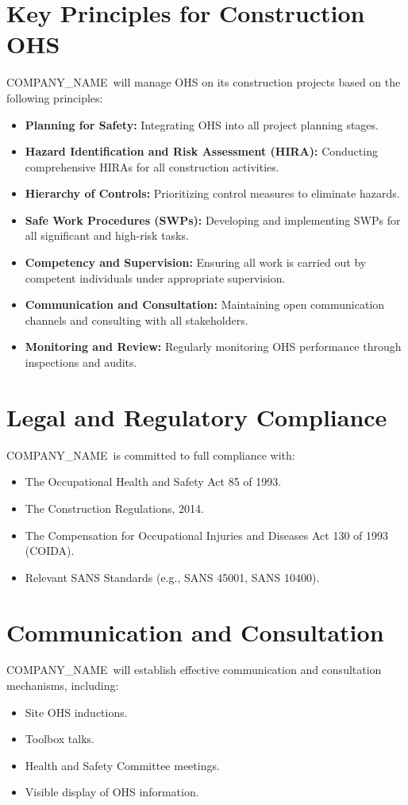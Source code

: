\documentclass[11pt]{article}
\newcommand{\clientName}{{{COMPANY_NAME}}}
\begin{document}
\section{Key Principles for Construction OHS}
\clientName\ will manage OHS on its construction projects based on the following principles:
\begin{itemize}
    \item \textbf{Planning for Safety:} Integrating OHS into all project planning stages.
    \item \textbf{Hazard Identification and Risk Assessment (HIRA):} Conducting comprehensive HIRAs for all construction activities.
    \item \textbf{Hierarchy of Controls:} Prioritizing control measures to eliminate hazards.
    \item \textbf{Safe Work Procedures (SWPs):} Developing and implementing SWPs for all significant and high-risk tasks.
    \item \textbf{Competency and Supervision:} Ensuring all work is carried out by competent individuals under appropriate supervision.
    \item \textbf{Communication and Consultation:} Maintaining open communication channels and consulting with all stakeholders.
    \item \textbf{Monitoring and Review:} Regularly monitoring OHS performance through inspections and audits.
\end{itemize}

\section{Legal and Regulatory Compliance}
\clientName\ is committed to full compliance with:
\begin{itemize}
    \item The Occupational Health and Safety Act 85 of 1993.
    \item The Construction Regulations, 2014.
    \item The Compensation for Occupational Injuries and Diseases Act 130 of 1993 (COIDA).
    \item Relevant SANS Standards (e.g., SANS 45001, SANS 10400).
\end{itemize}

\section{Communication and Consultation}
\clientName\ will establish effective communication and consultation mechanisms, including:
\begin{itemize}
    \item Site OHS inductions.
    \item Toolbox talks.
    \item Health and Safety Committee meetings.
    \item Visible display of OHS information.
\end{itemize}
\end{document}
